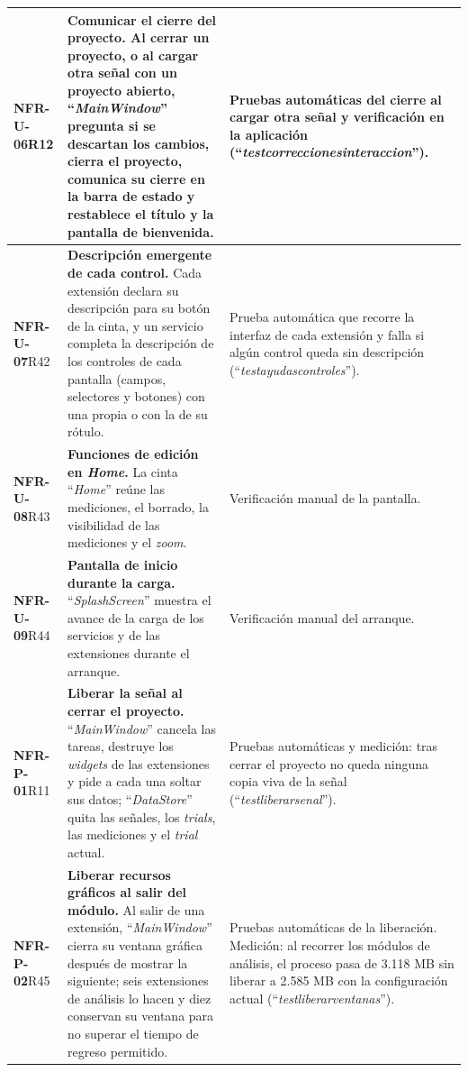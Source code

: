 \documentclass[12pt,letterpaper,oneside]{article}
\DeclareRobustCommand{\_}{\textunderscore\allowbreak}
\begin{document}
\begin{center}
\begin{longtable}{|>{\raggedright\arraybackslash}p{2.0cm}|>{\raggedright\arraybackslash}p{6.4cm}|>{\raggedright\arraybackslash}p{6.2cm}|}
\hline
\textbf{NFR-U-06}\newline R12 & \textbf{Comunicar el cierre del proyecto.} Al cerrar un proyecto, o al cargar otra señal con un proyecto abierto, “\textit{MainWindow}” pregunta si se descartan los cambios, cierra el proyecto, comunica su cierre en la barra de estado y restablece el título y la pantalla de bienvenida. & Pruebas automáticas del cierre al cargar otra señal y verificación en la aplicación (“\textit{test\_correcciones\_interaccion}”). \\
\hline
\textbf{NFR-U-07}\newline R42 & \textbf{Descripción emergente de cada control.} Cada extensión declara su descripción para su botón de la cinta, y un servicio completa la descripción de los controles de cada pantalla (campos, selectores y botones) con una propia o con la de su rótulo. & Prueba automática que recorre la interfaz de cada extensión y falla si algún control queda sin descripción (“\textit{test\_ayudas\_controles}”). \\
\hline
\textbf{NFR-U-08}\newline R43 & \textbf{Funciones de edición en \textit{Home}.} La cinta “\textit{Home}” reúne las mediciones, el borrado, la visibilidad de las mediciones y el \textit{zoom}. & Verificación manual de la pantalla. \\
\hline
\textbf{NFR-U-09}\newline R44 & \textbf{Pantalla de inicio durante la carga.} “\textit{SplashScreen}” muestra el avance de la carga de los servicios y de las extensiones durante el arranque. & Verificación manual del arranque. \\
\hline
\textbf{NFR-P-01}\newline R11 & \textbf{Liberar la señal al cerrar el proyecto.} “\textit{MainWindow}” cancela las tareas, destruye los \textit{widgets} de las extensiones y pide a cada una soltar sus datos; “\textit{DataStore}” quita las señales, los \textit{trials}, las mediciones y el \textit{trial} actual. & Pruebas automáticas y medición: tras cerrar el proyecto no queda ninguna copia viva de la señal (“\textit{test\_liberar\_senal}”). \\
\hline
\textbf{NFR-P-02}\newline R45 & \textbf{Liberar recursos gráficos al salir del módulo.} Al salir de una extensión, “\textit{MainWindow}” cierra su ventana gráfica después de mostrar la siguiente; seis extensiones de análisis lo hacen y diez conservan su ventana para no superar el tiempo de regreso permitido. & Pruebas automáticas de la liberación. Medición: al recorrer los módulos de análisis, el proceso pasa de 3.118 MB sin liberar a 2.585 MB con la configuración actual (“\textit{test\_liberar\_ventanas}”). \\

\end{longtable}
\end{center}
\end{document}

